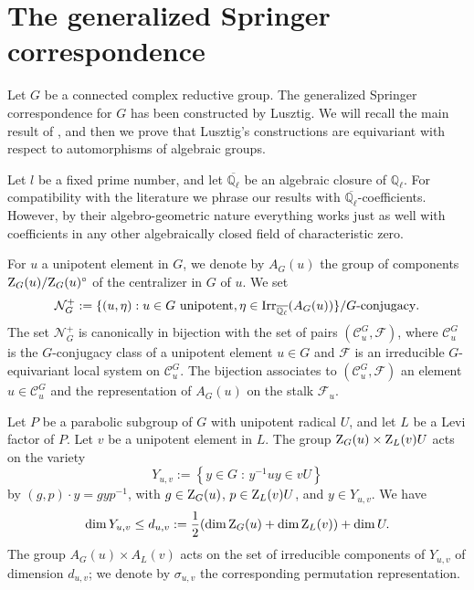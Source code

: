 \documentclass[11pt]{amsart}
\theoremstyle{definition}
\newcommand{\Q}{\mathbb Q}
\def\Irr{{\rm Irr}}
\def\cC{{\mathcal C}}
\def\cN{{\mathcal N}}
\def\cF{{\mathcal F}}
\def\Cent{{\rm Z}}
\begin{document}
\section{The generalized Springer correspondence}
\label{sec:genSpr}

Let $G$ be a connected complex reductive group.
The generalized Springer correspondence for $G$ has been constructed by Lusztig. 
We will recall the main result of \cite{Lus1}, and then we prove that Lusztig's
constructions are equivariant with respect to automorphisms of algebraic groups.

Let $l$ be a fixed prime number, and let $\overline{\Q_{\ell}}$
be an algebraic closure of $\Q_{\ell}$. For compatibility with the literature we
phrase our results with $\overline{\Q_{\ell}}$-coefficients. However, by their
algebro-geometric nature everything works just as well with coefficients in
any other algebraically closed field of characteristic zero.

For $u$ a unipotent element in $G$, we denote by $A_{G}(u)$ the group of 
components $\Cent_{G}(u)/\Cent_{G}(u)^\circ$ of the centralizer in 
$G$ of $u$. We set
\[
\cN_{G}^+ := \{ (u,\eta ) : u \in G \text{ unipotent} , 
\eta \in \Irr_{\overline{\Q_{\ell}}} (A_{G} (u)) \} / G\text{-conjugacy}.
\]
The set $\cN_{G}^+$ is canonically in bijection with the set of pairs 
$(\cC_u^{G},\cF)$, where $\cC_u^{G}$ is the $G$-conjugacy class 
of a unipotent element $u\in G$ 
and $\cF$ is an irreducible $G$-equivariant local system on $\cC_u^{G}$.
The bijection associates to $(\cC_u^{G},\cF)$ an element $u \in \cC_u^G$
and the representation of $A_G (u)$ on the stalk $\cF_u$.

Let $P$ be a parabolic subgroup of $G$ with unipotent radical $U$, and let $L$ be 
a Levi factor of $P$. Let $v$ be a unipotent element in $L$. The group 
$\Cent_{G}(u)\times\Cent_{L}(v)U$ acts on the variety 
\begin{equation}\label{eq:2.2}
Y_{u,v} := \left\{y\in G \;:\, y^{-1}uy\in vU\right\} 
\end{equation}
by $(g,p)\cdot y=gyp^{-1}$, with $g\in\Cent_{G}(u)$, $p\in\Cent_{L}(v) U$, 
and $y\in Y_{u,v}$. We have 
\[
\dim Y_{u,v}\le d_{u,v} :=
\frac{1}{2}(\dim \Cent_{G}(u)+\dim\Cent_{L}(v))+\dim U.
\] 
The group $A_{G}(u)\times A_{L} (v)$ acts on the set of irreducible components of 
$Y_{u,v}$ of dimension $d_{u,v}$; we denote by $\sigma_{u,v}$ the corresponding 
permutation representation.
 
\end{document}
